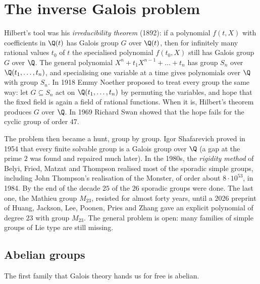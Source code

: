 \section{The inverse Galois problem}

Hilbert's tool was his \emph{irreducibility theorem} (1892): if a polynomial $f(t,X)$ with coefficients in $\Q(t)$ has Galois group $G$ over $\Q(t)$, then
for infinitely many rational values $t_0$ of $t$ the specialised polynomial $f(t_0,X)$ still has Galois group $G$ over $\Q$. The general polynomial
$X^n+t_1X^{n-1}+\dots+t_n$ has group $S_n$ over $\Q(t_1,\dots,t_n)$, and specialising one variable at a time gives polynomials over $\Q$ with group $S_n$.
In 1918 Emmy Noether proposed to treat every group the same way: let $G\subseteq S_n$ act on $\Q(t_1,\dots,t_n)$ by permuting the variables, and hope that
the fixed field is again a field of rational functions. When it is, Hilbert's theorem produces $G$ over $\Q$. In 1969 Richard Swan showed that the hope
fails for the cyclic group of order $47$.

The problem then became a hunt, group by group. Igor Shafarevich proved in 1954 that every finite solvable group is a Galois group over $\Q$ (a gap at the
prime $2$ was found and repaired much later). In the 1980s, the \emph{rigidity method} of Belyi, Fried, Matzat and Thompson realised most of the sporadic
simple groups, including John Thompson's realisation of the Monster, of order about $8\cdot10^{53}$, in 1984. By the end of the decade $25$ of the
$26$ sporadic groups were done. The last one, the Mathieu group $M_{23}$, resisted for almost forty years, until a 2026 preprint of Huang, Jackson, Lee,
Poonen, Pries and Zhang gave an explicit polynomial of degree $23$ with group $M_{23}$. The general problem is open: many families of simple groups of Lie
type are still missing.

\subsection*{Abelian groups}

The first family that Galois theory hands us for free is abelian.

